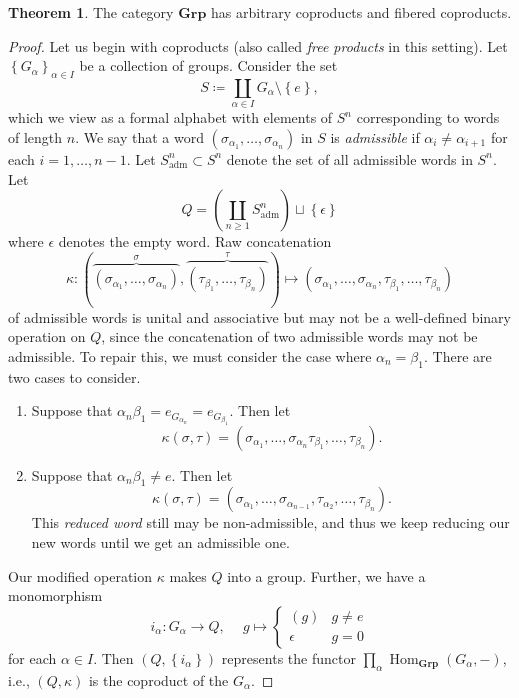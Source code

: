 \documentclass[10pt,letterpaper,cm]{nupset}
\theoremstyle{definition}
\theoremstyle{theorem}
\newtheorem{theorem}[definition]{Theorem}
\theoremstyle{remark}
\newcommand{\1}{\mathbf{1}}
\newcommand{\0}{\vec 0}
\DeclareMathOperator{\ad}{adm}
\DeclareMathOperator{\Hom}{Hom}
\begin{document}
\begin{theorem} 
The category $\mathbf{Grp}$ has arbitrary coproducts and fibered coproducts.
\end{theorem}
\begin{proof}
Let us begin with coproducts (also called \textit{free products} in this setting). Let $\left\{G_{\alpha}\right\}_{\alpha \in I}$ be a collection of groups. Consider the set
\[
S\coloneqq \coprod_{\alpha \in I}{G_{\alpha}\setminus \left\{e\right\}},
\] which we view as a formal alphabet with elements of $S^n$ corresponding to words of length $n$. We say that a word $\left(\sigma_{\alpha_1}, \ldots, \sigma_{\alpha_n}\right)$ in $S$ is \textit{admissible} if $\alpha_i \ne \alpha_{i+1}$ for each $i=1, \ldots, n-1$. Let $S_{\ad}^n\subset S^n$ denote the set of   all admissible words in $S^n$. Let
\[
Q = \left(\coprod_{n\geq 1}S_{\ad}^n \right)\sqcup \left\{\epsilon\right\}
\] where $\epsilon$ denotes the empty word. Raw concatenation 
\[
\kappa : \left(\overbrace{\left(\sigma_{\alpha_1}, \ldots, \sigma_{\alpha_n}\right)}^{\sigma},  \overbrace{\left(\tau_{\beta_1}, \ldots, \tau_{\beta_n}\right)}^{\tau} \right) \mapsto \left( \sigma_{\alpha_1}, \ldots, \sigma_{\alpha_n}, \tau_{\beta_1}, \ldots, \tau_{\beta_n}\right)
\] of admissible words is unital and associative but may not be a well-defined binary operation on $Q$, since the concatenation of two admissible words may not be admissible. To repair this, we must consider the case where $\alpha_n = \beta_1$. There are two cases to consider.
\begin{enumerate}[label=(\alph*)]
\item Suppose that $\alpha_n\beta_1 = e_{G_{\alpha_n}} =  e_{G_{\beta_1}}$. Then let $$\kappa(\sigma, \tau) =  \left( \sigma_{\alpha_1}, \ldots, \sigma_{\alpha_n}\tau_{\beta_1}, \ldots, \tau_{\beta_n}\right).$$
\item Suppose that $\alpha_n\beta_1 \ne e$. Then let $$\kappa(\sigma, \tau) =  \left( \sigma_{\alpha_1}, \ldots, \sigma_{\alpha_{n-1}}, \tau_{\alpha_2}, \ldots, \tau_{\beta_n}\right).$$ This \textit{reduced word} still may be non-admissible, and thus we keep reducing our new words until we get an admissible one.
\end{enumerate}
Our modified operation $\kappa$ makes $Q$ into a group. Further, we have a monomorphism
\[
i_{\alpha} : G_{\alpha} \to Q, \ \quad g \mapsto \begin{cases} \left(g\right) & g \ne e \\ \epsilon & g=0\end{cases}
\] for each $\alpha \in I$. Then $\left(Q, \left\{i_{\alpha}\right\}\right)$ represents  the functor $\prod_{\alpha}\Hom_{\mathbf{Grp}}(G_{\alpha}, {-})$, i.e., $\left(Q, \kappa\right)$ is the coproduct of the $G_{\alpha}$.


\end{proof}
\end{document}

